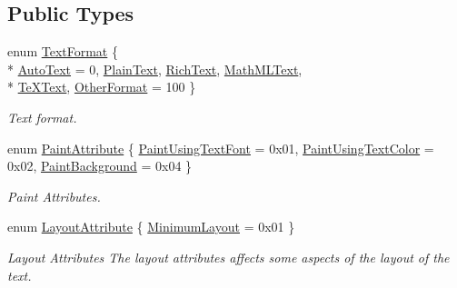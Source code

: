 \subsection*{Public Types}
\begin{DoxyCompactItemize}
\item 
enum \hyperlink{class_qwt_text_a63e0d6a59a427a37ed0bfa71b782fd76}{Text\-Format} \{ \\*
\hyperlink{class_qwt_text_a63e0d6a59a427a37ed0bfa71b782fd76a0645d333081ec9e3574c98f510c284a1}{Auto\-Text} = 0, 
\hyperlink{class_qwt_text_a63e0d6a59a427a37ed0bfa71b782fd76aa6810f6d3c785c202d2507c601b97787}{Plain\-Text}, 
\hyperlink{class_qwt_text_a63e0d6a59a427a37ed0bfa71b782fd76a88f7eee487ce6f7769b67494623d8b79}{Rich\-Text}, 
\hyperlink{class_qwt_text_a63e0d6a59a427a37ed0bfa71b782fd76abf479897e4514198246a0b232a597caf}{Math\-M\-L\-Text}, 
\\*
\hyperlink{class_qwt_text_a63e0d6a59a427a37ed0bfa71b782fd76af31a767faf2f7e322941866c6140ddc6}{Te\-X\-Text}, 
\hyperlink{class_qwt_text_a63e0d6a59a427a37ed0bfa71b782fd76ad69e3155611ef96eb14ed0cfeb69fd3d}{Other\-Format} = 100
 \}
\begin{DoxyCompactList}\small\item\em Text format. \end{DoxyCompactList}\item 
enum \hyperlink{class_qwt_text_a9739e47ea489e690f121e4b1d27ae24e}{Paint\-Attribute} \{ \hyperlink{class_qwt_text_a9739e47ea489e690f121e4b1d27ae24eac12e48f17fd02a6bc1840c61c4862a65}{Paint\-Using\-Text\-Font} = 0x01, 
\hyperlink{class_qwt_text_a9739e47ea489e690f121e4b1d27ae24ea1aa48cee0a54089820e77600cf93dc4b}{Paint\-Using\-Text\-Color} = 0x02, 
\hyperlink{class_qwt_text_a9739e47ea489e690f121e4b1d27ae24ea77dd66b2a65e9998d9803672791e1456}{Paint\-Background} = 0x04
 \}
\begin{DoxyCompactList}\small\item\em Paint Attributes. \end{DoxyCompactList}\item 
enum \hyperlink{class_qwt_text_a0953aabc098f410dba89bbada47f2e5a}{Layout\-Attribute} \{ \hyperlink{class_qwt_text_a0953aabc098f410dba89bbada47f2e5aa35990c4c74747580e9357d490ebce42f}{Minimum\-Layout} = 0x01
 \}
\begin{DoxyCompactList}\small\item\em Layout Attributes The layout attributes affects some aspects of the layout of the text. \end{DoxyCompactList}\item 

\end{DoxyCompactItemize}
